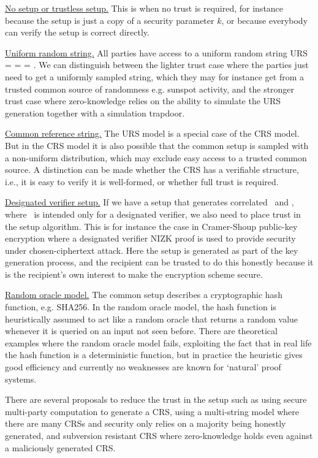 \begin{bulletize}
	\item \underline{No setup or trustless setup.}
	This is when no trust is required, for instance because the setup is just a copy of a security parameter $k$, or because everybody can verify the setup is correct directly.
    
	\item \underline{Uniform random string.}
	All parties have access to a uniform random string URS = \setR = \setP = \setV. 
	We can distinguish between the lighter trust case where the parties just need to get a uniformly sampled string, which they may for instance get from a trusted common source of randomness e.g. sunspot activity, and the stronger trust case where zero-knowledge relies on the ability to simulate the URS generation together with a simulation trapdoor.

  \item \underline{Common reference string.}
	The URS model is a special case of the CRS model. 
	But in the CRS model it is also possible that the common setup is sampled with a non-uniform distribution, which may exclude easy access to a trusted common source. 
	A distinction can be made whether the CRS has a verifiable structure, i.e., it is easy to verify it is well-formed, or whether full trust is required.
    
	\item \underline{Designated verifier setup.}
	If we have a setup that generates correlated \setP\ and \setV, where \setV\ is intended only for a designated verifier, we also need to place trust in the setup algorithm. 
	This is for instance the case in Cramer-Shoup public-key encryption where a designated verifier NIZK proof is used to provide security under chosen-ciphertext attack. 
	Here the setup is generated as part of the key generation process, and the recipient can be trusted to do this honestly because it is the recipient’s own interest to make the encryption scheme secure.
    
	\item \underline{Random oracle model.}
	The common setup describes a cryptographic hash function, e.g. SHA256. 
	In the random oracle model, the hash function is heuristically assumed to act like a random oracle that returns a random value whenever it is queried on an input not seen before. 
	There are theoretical examples where the random oracle model fails, exploiting the fact that in real life the hash function is a deterministic function, but in practice the heuristic gives good efficiency and currently no weaknesses are known for ‘natural’ proof systems.
    
	\item There are several proposals to reduce the trust in the setup such as using secure multi-party computation to generate a CRS, using a multi-string model where there are many CRSs and security only relies on a majority being honestly generated, and subversion resistant CRS where zero-knowledge holds even against a maliciously generated CRS.
\end{bulletize}

